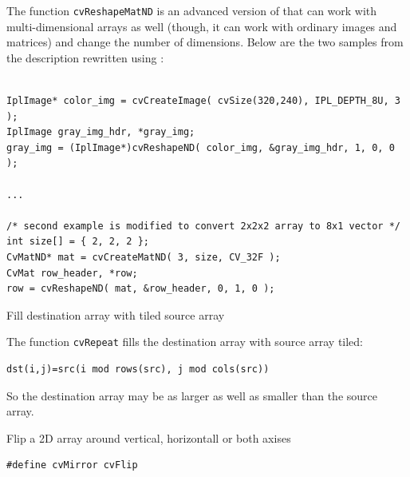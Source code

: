 The function \texttt{cvReshapeMatND} is an advanced version of  that can work with multi-dimensional arrays as well (though, it can work with ordinary images and matrices) and change the number of dimensions. Below are the two samples from the  description rewritten using :

\begin{lstlisting}

IplImage* color_img = cvCreateImage( cvSize(320,240), IPL_DEPTH_8U, 3 );
IplImage gray_img_hdr, *gray_img;
gray_img = (IplImage*)cvReshapeND( color_img, &gray_img_hdr, 1, 0, 0 );

...

/* second example is modified to convert 2x2x2 array to 8x1 vector */
int size[] = { 2, 2, 2 };
CvMatND* mat = cvCreateMatND( 3, size, CV_32F );
CvMat row_header, *row;
row = cvReshapeND( mat, &row_header, 0, 1, 0 );

\end{lstlisting}

\label{Repeat}

Fill destination array with tiled source array


\begin{description}
\end{description}


The function \texttt{cvRepeat} fills the destination array with source array tiled:

\begin{lstlisting}
dst(i,j)=src(i mod rows(src), j mod cols(src))
\end{lstlisting}

So the destination array may be as larger as well as smaller than the source array.


\label{Flip}

Flip a 2D array around vertical, horizontall or both axises


\begin{lstlisting}
#define cvMirror cvFlip
\end{lstlisting}

